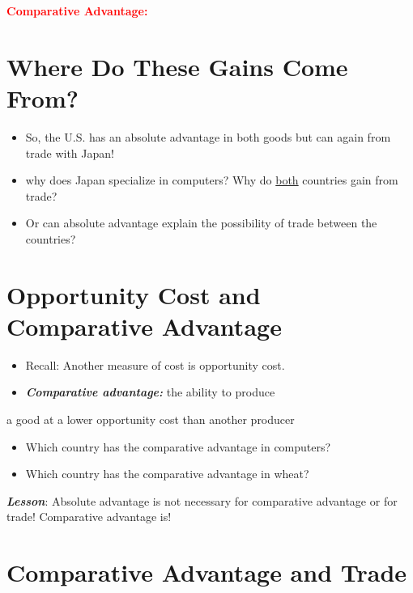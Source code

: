 \documentclass[
]{book}
\begin{document}
\textcolor{red}{\textbf{Comparative Advantage:}}

\hypertarget{where-do-these-gains-come-from}{%
\section{Where Do These Gains Come From?}\label{where-do-these-gains-come-from}}

\begin{itemize}
\item
  So, the U.S. has an absolute advantage in both goods but can again from trade with Japan!
\item
  why does Japan specialize in computers? Why do \underline{both} countries gain from trade?
\item
  Or can absolute advantage explain the possibility of trade between the countries?
\end{itemize}

\hypertarget{opportunity-cost-and-comparative-advantage}{%
\section{Opportunity Cost and Comparative Advantage}\label{opportunity-cost-and-comparative-advantage}}

\begin{itemize}
\item
  Recall: Another measure of cost is opportunity cost.
\item
  \textbf{\emph{Comparative advantage:}} the ability to produce
\end{itemize}

a good at a lower opportunity cost than another producer

\begin{itemize}
\item
  Which country has the comparative advantage in computers?
\item
  Which country has the comparative advantage in wheat?
\end{itemize}

\bigskip

\textbf{\emph{Lesson}}: Absolute advantage is not necessary for comparative advantage or for trade! Comparative advantage is!

\hypertarget{comparative-advantage-and-trade}{%
\section{Comparative Advantage and Trade}\label{comparative-advantage-and-trade}}
\end{document}
